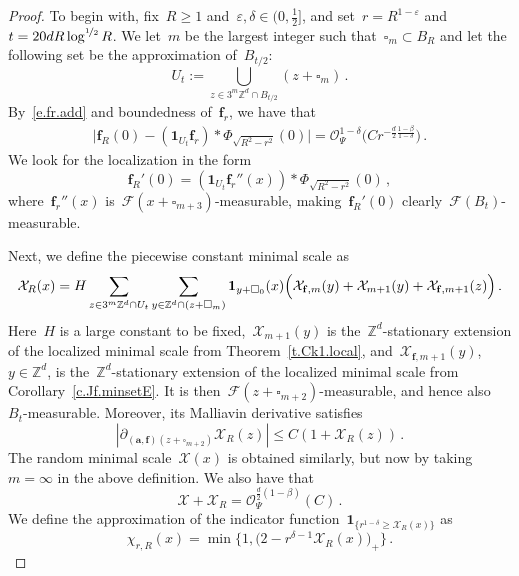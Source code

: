 \documentclass[11pt,twoside]{article} %
\let\oldsquare\square %
\renewcommand{\square}{\oldsquare}
\numberwithin{equation}{section}
\theoremstyle{definition}
\newcommand*{\Z}{\ensuremath{\mathbb{Z}}}
\newcommand{\eps}{\varepsilon}
\newcommand{\f}{\mathbf{f}}
\newcommand{\ep}{\eps}
\renewcommand{\a}{\mathbf{a}}
\newcommand{\cu}{\square}
\newcommand{\F}{\mathcal{F}}
\newcommand{\X}{\mathcal{X}}
\renewcommand{\O}{\mathcal{O}}
\newcommand{\indc}{\boldsymbol{1}}
\newcommand{\minscale}{\chi}
\begin{document}
\begin{proof}
To begin with, fix~$R \geq 1$ and~$\ep,\delta \in (0,\frac12]$, and set~$r = R^{1-\ep}$ and~$t = 20 d R \log^{\nicefrac 12} R$. We let~$m$ be the largest integer such that~$\cu_m \subset B_R$ and let the following set be the approximation of~$B_{t/2}$:
\begin{equation*}  
U_t := \bigcup_{z \in 3^m \Z^d \cap B_{t/2}} (z + \cu_m)\,.
\end{equation*}
By~\eqref{e.fr.add} and boundedness of~$\f_r$, we have that
\begin{align*}  
\big| \f_R(0) - (\indc_{U_t} \f_r) \ast \Phi_{\sqrt{R^2-r^2}}(0) \big|   
= 
\O_\Psi^{1-\delta} \bigl( C r^{-\frac{d}{2}\frac{1-\beta}{1-\delta}} \bigr)\,.
\end{align*}
We look for the localization in the form
\begin{equation*}  
\f_R'(0) =  (\indc_{U_t} \f_r''(x)) \ast \Phi_{\sqrt{R^2-r^2}}(0)\,,
\end{equation*}
where~$\f_r''(x)$ is~$\F(x + \cu_{m+3})$-measurable, making~$\f_R'(0)$ clearly~$\F(B_t)$-measurable. 


\smallskip

Next, we define the piecewise constant minimal scale as
\begin{equation*}  
\X_R(x) = H \sum_{z \in 3^m \Z^d \cap U_t} \sum_{y \in \Z^d \cap (z + \cu_m)} 
\indc_{y + \cu_0}(x) \Bigl( \X_{\f,m}(y) + \X_{m+1}(y) + \X_{\f,m+1}(z) \Bigr)\,.
\end{equation*}
Here~$H$ is a large constant to be fixed,~$\X_{m+1}(y)$ is the~$\Z^d$-stationary extension of the localized minimal scale from Theorem~\ref{t.Ck1.local}, and~$\X_{\f,m+1}(y)$,~$y \in \Z^d$,  is the~$\Z^d$-stationary extension of the localized minimal scale from Corollary~\ref{c.Jf.minsetE}. It is then~$\F(z + \cu_{m+2})$-measurable, and hence also~$B_{t}$-measurable. Moreover, its Malliavin derivative satisfies
\begin{equation*} 
|\partial_{(\a,\f)(z+\cu_{m+2})}\X_R(z)| \leq C(1 + \X_R(z)) \,.
\end{equation*}
The random minimal scale~$\X(x)$ is obtained similarly, but now by taking~$m = \infty$ in the above definition. We also have that
\begin{equation*}  
\X + \X_R 
= 
\O_\Psi^{\frac d2(1-\beta)}(C)
\,.
\end{equation*}
We define the approximation of the indicator function~$\indc_{\{ r^{1-\delta} \geq  \X_{R}(x)\}}$ as
\begin{equation}  \label{e.fr.localization.minscale}
\minscale_{r,R}(x) = \min\big\{1, \bigl(2 -    r^{\delta-1} \X_{R}(x) \bigr)_+ \big\} \,.
\end{equation}


\end{proof}
\end{document}
